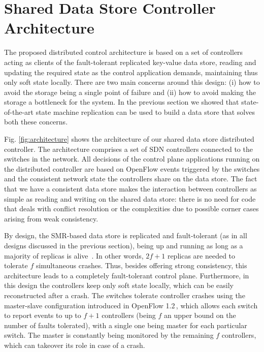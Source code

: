 
\section{Shared Data Store Controller Architecture}
\glsresetall
\label{sec:heimdall:architecture}

The proposed distributed control architecture is based on a set of controllers acting as clients of the fault-tolerant replicated key-value data store, reading and updating the required state as the control application demands, maintaining thus only soft state locally.
There are two main concerns around this design: (i) how to avoid the storage being a single point of failure and (ii) how to avoid making the storage a bottleneck for the system.
In the previous section we showed that state-of-the-art state machine replication can be used to build a data store that solves both these concerns.

Fig. \ref{fig:architecture} shows the architecture of our shared data store distributed controller.
The architecture comprises a set of SDN controllers connected to the switches in the network.
All decisions of the control plane applications running on the distributed controller are based on OpenFlow events triggered by the switches and the consistent network state the controllers share on the data store.
The fact that we have a consistent data store makes the interaction between controllers as simple as reading and writing on the shared data store: there is no need for code that deals with conflict resolution or the complexities due to possible corner cases arising from weak consistency.

By design, the SMR-based data store is replicated and fault-tolerant (as in all designs discussed in the previous section), being up and running as long as a majority of replicas is alive~\cite{Lam98}.
In other words, $2f+1$ replicas are needed to tolerate $f$ simultaneous crashes.
Thus, besides offering strong consistency, this architecture leads to a completely fault-tolerant control plane.
Furthermore, in this design the controllers keep only soft state locally, which can be easily reconstructed after a crash.
The switches tolerate controller crashes using the master-slave configuration introduced in OpenFlow 1.2\,\cite{ONF2011}, which allows each switch to report events to up to $f+1$ controllers (being $f$ an upper bound on the number of faults tolerated), with a single one being master for each particular switch.
The master is constantly being monitored by the remaining $f$ controllers, which can takeover its role in case of a crash.

